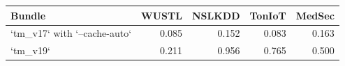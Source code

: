 \begin{tabular}{lrrrr}
\toprule
Bundle & WUSTL & NSLKDD & TonIoT & MedSec \\
\midrule
`tm\_v17` with `--cache-auto` & 0.085 & 0.152 & 0.083 & 0.163 \\
`tm\_v19` & 0.211 & 0.956 & 0.765 & 0.500 \\
\bottomrule
\end{tabular}
